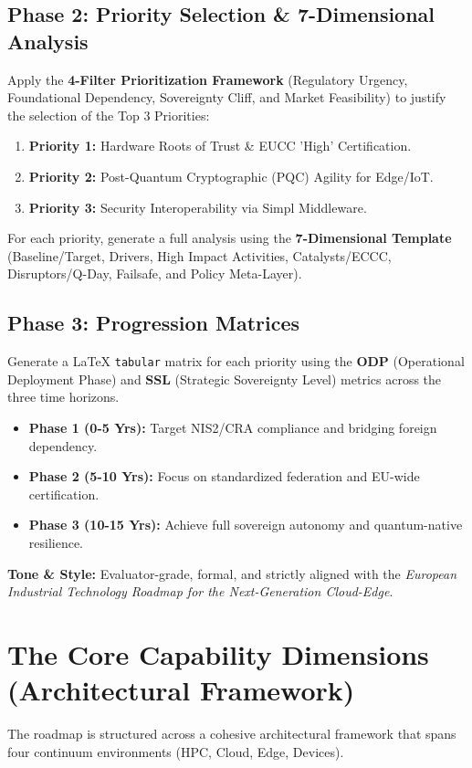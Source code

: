\documentclass[12pt,a4paper]{article}
\begin{document}
\subsection*{Phase 2: Priority Selection \& 7-Dimensional Analysis}
Apply the \textbf{4-Filter Prioritization Framework} (Regulatory Urgency, Foundational Dependency, Sovereignty Cliff, and Market Feasibility) to justify the selection of the Top 3 Priorities:
\begin{enumerate}
    \item \textbf{Priority 1:} Hardware Roots of Trust \& EUCC 'High' Certification.
    \item \textbf{Priority 2:} Post-Quantum Cryptographic (PQC) Agility for Edge/IoT.
    \item \textbf{Priority 3:} Security Interoperability via Simpl Middleware.
\end{enumerate}
For each priority, generate a full analysis using the \textbf{7-Dimensional Template} (Baseline/Target, Drivers, High Impact Activities, Catalysts/ECCC, Disruptors/Q-Day, Failsafe, and Policy Meta-Layer).

\subsection*{Phase 3: Progression Matrices}
Generate a LaTeX \texttt{tabular} matrix for each priority using the \textbf{ODP} (Operational Deployment Phase) and \textbf{SSL} (Strategic Sovereignty Level) metrics across the three time horizons.
\begin{itemize}
    \item \textbf{Phase 1 (0-5 Yrs):} Target NIS2/CRA compliance and bridging foreign dependency.
    \item \textbf{Phase 2 (5-10 Yrs):} Focus on standardized federation and EU-wide certification.
    \item \textbf{Phase 3 (10-15 Yrs):} Achieve full sovereign autonomy and quantum-native resilience.
\end{itemize}

\noindent\textbf{Tone \& Style:} Evaluator-grade, formal, and strictly aligned with the \textit{European Industrial Technology Roadmap for the Next-Generation Cloud-Edge}.


\section{The Core Capability Dimensions (Architectural Framework)}
The roadmap is structured across a cohesive architectural framework that spans four continuum environments (HPC, Cloud, Edge, Devices).
\end{document}
